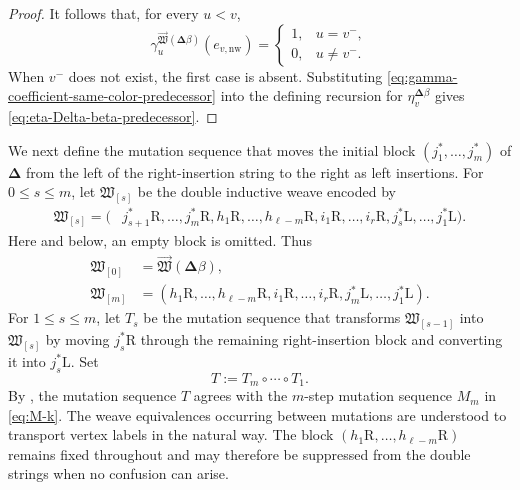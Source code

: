 \documentclass[12pt, reqno]{amsart}
\theoremstyle{plain}
\theoremstyle{definition}
\numberwithin{equation}{section}
\begin{document}
\begin{proof}
It follows that, for every \(u<v\),
\begin{equation}\label{eq:gamma-coefficient-same-color-predecessor}
    \gamma_u^{\overrightarrow{\mathfrak W}
        (\boldsymbol{\Delta}\beta)}(e_{v,\mathrm{nw}})
    =
    \begin{cases}
        1,&u=v^-,\\
        0,&u\neq v^-.
    \end{cases}
\end{equation}
When \(v^-\) does not exist, the first case is absent. Substituting
\eqref{eq:gamma-coefficient-same-color-predecessor} into the defining
recursion for \(\eta_v^{\boldsymbol{\Delta}\beta}\) gives
\eqref{eq:eta-Delta-beta-predecessor}.
\end{proof}

We next define the mutation sequence that moves the initial block
\((j_1^*,\ldots,j_m^*)\) of \(\boldsymbol{\Delta}\) from the left
of the right-insertion string to the right as left insertions. For
\(0\leq s\leq m\), let \(\mathfrak W_{[s]}\) be the double
inductive weave encoded by
\begin{equation}\label{eq:intermediate-Delta-beta-weaves}
\begin{aligned}
    \mathfrak W_{[s]}=\bigl(&
      j_{s+1}^*\mathrm R,\ldots,j_m^*\mathrm R,
      h_1\mathrm R,\ldots,h_{\ell-m}\mathrm R,
      i_1\mathrm R,\ldots,i_r\mathrm R,j_s^*\mathrm L,\ldots,j_1^*\mathrm L\bigr).
\end{aligned}
\end{equation}
Here and below, an empty block is omitted. Thus
\begin{equation}\label{eq:initial-final-Delta-beta-weaves}
\begin{aligned}
    \mathfrak W_{[0]}
    &=
    \overrightarrow{\mathfrak W}
       (\boldsymbol{\Delta}\beta),\\
    \mathfrak W_{[m]}
    &=
    (h_1\mathrm R,\ldots,h_{\ell-m}\mathrm R,
      i_1\mathrm R,\ldots,i_r\mathrm R,
      j_m^*\mathrm L,\ldots,j_1^*\mathrm L).
\end{aligned}
\end{equation}
For \(1\leq s\leq m\), let \(T_s\) be the mutation sequence that
transforms \(\mathfrak W_{[s-1]}\) into
\(\mathfrak W_{[s]}\) by moving \(j_s^*\mathrm R\) through the
remaining right-insertion block and converting it into
\(j_s^*\mathrm L\). Set
\begin{equation}\label{eq:mutation-sequence-T}
    T:=T_m\circ\cdots\circ T_1.
\end{equation}
By \cite[Lemma~3.11]{bi2026towards}, the mutation sequence \(T\)
agrees with the \(m\)-step mutation sequence \(M_m\) in
\eqref{eq:M-k}.
The weave equivalences occurring between mutations are understood to
transport vertex labels in the natural way. The block
\((h_1\mathrm R,\ldots,h_{\ell-m}\mathrm R)\) remains fixed
throughout and may therefore be suppressed from the double strings
when no confusion can arise.
\end{document}
